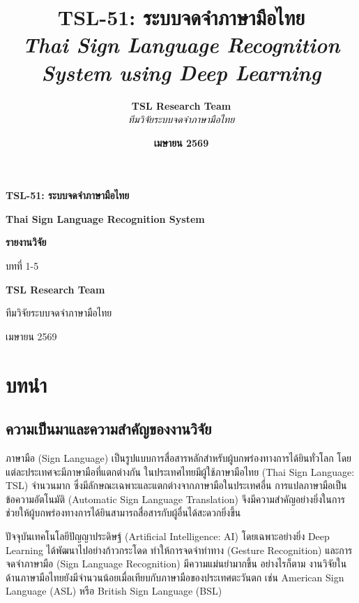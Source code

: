 \documentclass[12pt,a4paper]{report}
\title{
    \textbf{TSL-51: ระบบจดจำภาษามือไทย} \\
    \textit{Thai Sign Language Recognition System using Deep Learning}
}
\author{
    \textbf{TSL Research Team} \\
    \textit{ทีมวิจัยระบบจดจำภาษามือไทย}
}
\date{\textbf{เมษายน 2569}}
\begin{document}
\thispagestyle{empty}

\begin{center}
\vspace*{2in}
{\Huge\bfseries TSL-51: ระบบจดจำภาษามือไทย\par}
\vspace{0.5in}
{\Large\bfseries Thai Sign Language Recognition System\par}
\vspace{1in}
{\LARGE\bfseries รายงานวิจัย\par}
\vspace{0.5in}
{\Large บทที่ 1-5\par}
\vspace{1.5in}
{\Large\bfseries TSL Research Team\par}
{\Large ทีมวิจัยระบบจดจำภาษามือไทย\par}
\vspace{0.5in}
{\Large เมษายน 2569\par}
\end{center}

\clearpage

\tableofcontents
\clearpage

\chapter{บทนำ}

\section{ความเป็นมาและความสำคัญของงานวิจัย}

ภาษามือ (Sign Language) เป็นรูปแบบการสื่อสารหลักสำหรับผู้บกพร่องทางการได้ยินทั่วโลก โดยแต่ละประเทศจะมีภาษามือที่แตกต่างกัน 
ในประเทศไทยมีผู้ใช้ภาษามือไทย (Thai Sign Language: TSL) จำนวนมาก ซึ่งมีลักษณะเฉพาะและแตกต่างจากภาษามือในประเทศอื่น 
การแปลภาษามือเป็นข้อความอัตโนมัติ (Automatic Sign Language Translation) จึงมีความสำคัญอย่างยิ่งในการช่วยให้ผู้บกพร่องทางการได้ยินสามารถสื่อสารกับผู้อื่นได้สะดวกยิ่งขึ้น

ปัจจุบันเทคโนโลยีปัญญาประดิษฐ์ (Artificial Intelligence: AI) โดยเฉพาะอย่างยิ่ง Deep Learning ได้พัฒนาไปอย่างก้าวกระโดด 
ทำให้การจดจำท่าทาง (Gesture Recognition) และการจดจำภาษามือ (Sign Language Recognition) มีความแม่นยำมากขึ้น 
อย่างไรก็ตาม งานวิจัยในด้านภาษามือไทยยังมีจำนวนน้อยเมื่อเทียบกับภาษามือของประเทศตะวันตก เช่น American Sign Language (ASL) 
หรือ British Sign Language (BSL)
\end{document}
